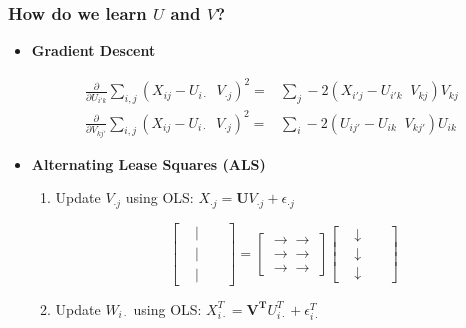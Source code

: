 \documentclass[xcolor={dvipsnames}]{beamer}
\begin{document}
\frame
{
\frametitle{How do we learn $U$ and $V$?}

\begin{itemize}
\item<2-> \textbf{Gradient Descent} 
\vspace{-.5em}
\scriptsize

\begin{align*} 
\frac{\partial}{\partial U_{i'k}} \sum_{i,j} (X_{ij} - {U_{i\cdot}}\;\; {V_{\cdot j}})^2 = {}&  \sum_{j} -2(X_{i'j} - U_{i'k}\;\; V_{kj})V_{kj} \\
\frac{\partial}{\partial V_{kj'}} \sum_{i,j} (X_{ij} - {U_{i\cdot}}\;\; {V_{\cdot j}})^2 ={}& \sum_{i} -2(U_{ij'} - U_{ik}\;\; V_{kj'})U_{ik}
\end{align*}

\normalsize 

\item<3-> \textbf{Alternating Lease Squares (ALS)}
\begin{enumerate}

\footnotesize

\item Update $V_{\cdot j}$ using OLS: $X_{\cdot j} = \mathbf{U} {V_{\cdot j}} + \epsilon_{\cdot j}$

\tiny

$$\left[\begin{array}{cccc} & | && \\& | &&  \\& | &&  \end{array} \right] = \left[\begin{array}{c} \longrightarrow\longrightarrow \\ \longrightarrow\longrightarrow \\ \longrightarrow\longrightarrow  \end{array} \right] \left[\begin{array}{cccc} & \downarrow && \\&  \downarrow  && \\&  \downarrow  &&  \end{array} \right] $$

\footnotesize


\item Update $W_{i \cdot}$ using OLS: $X_{i\cdot}^T = \mathbf{V^T} {U_{i \cdot}^T}  + \epsilon_{i \cdot}^T$


\end{enumerate}
\end{itemize}}
\end{document}
